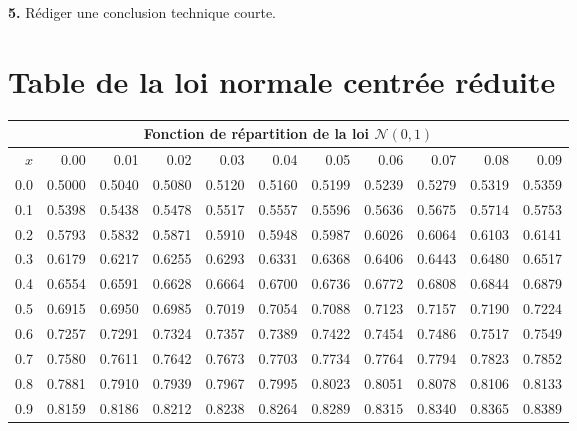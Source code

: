 \textbf{5.} Rédiger une conclusion technique courte.

\vspace{1em}

\newpage

\section*{Table de la loi normale centrée réduite}

\vspace{1cm}

\begin{center}
    \begin{tabular}{|r|r@{\ }r@{\ }r@{\ }r@{\ }r@{\ }r@{\ }r@{\ }r@{\ }r@{\ }r@{\ }|}
    \hline
    \multicolumn{11}{|c|}{ Fonction de répartition de la loi $\mathcal{N}(0,1)$}\\
    \hline
    \hline
    $x$&0.00&0.01&0.02&0.03&0.04&0.05&0.06&0.07&0.08&0.09\\
    \hline
    0.0&0.5000&0.5040&0.5080&0.5120&0.5160&0.5199&0.5239&0.5279&0.5319&0.5359\\
    \hline
    0.1&0.5398&0.5438&0.5478&0.5517&0.5557&0.5596&0.5636&0.5675&0.5714&0.5753\\
    \hline
    0.2&0.5793&0.5832&0.5871&0.5910&0.5948&0.5987&0.6026&0.6064&0.6103&0.6141\\
    \hline
    0.3&0.6179&0.6217&0.6255&0.6293&0.6331&0.6368&0.6406&0.6443&0.6480&0.6517\\
    \hline
    0.4&0.6554&0.6591&0.6628&0.6664&0.6700&0.6736&0.6772&0.6808&0.6844&0.6879\\
    \hline
    0.5&0.6915&0.6950&0.6985&0.7019&0.7054&0.7088&0.7123&0.7157&0.7190&0.7224\\
    \hline
    0.6&0.7257&0.7291&0.7324&0.7357&0.7389&0.7422&0.7454&0.7486&0.7517&0.7549\\
    \hline
    0.7&0.7580&0.7611&0.7642&0.7673&0.7703&0.7734&0.7764&0.7794&0.7823&0.7852\\
    \hline
    0.8&0.7881&0.7910&0.7939&0.7967&0.7995&0.8023&0.8051&0.8078&0.8106&0.8133\\
    \hline
    0.9&0.8159&0.8186&0.8212&0.8238&0.8264&0.8289&0.8315&0.8340&0.8365&0.8389\\

\end{tabular}
\end{center}
